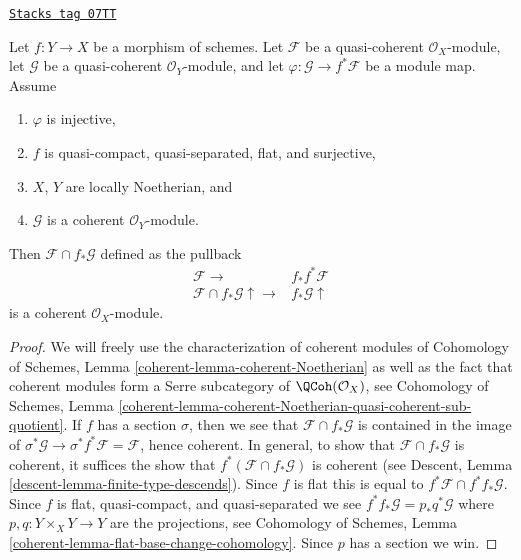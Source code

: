 \begin{lemma}
\label{groupoids-lemma-push-pull}
\href{https://stacks.math.columbia.edu/tag/07TT}{\texttt{Stacks tag 07TT}}

Let $f : Y \to X$ be a morphism of schemes. Let $\mathcal{F}$
be a quasi-coherent $\mathcal{O}_X$-module, let $\mathcal{G}$
be a quasi-coherent $\mathcal{O}_Y$-module, and let
$\varphi : \mathcal{G} \to f^*\mathcal{F}$ be a module map. Assume
\begin{enumerate}
\item $\varphi$ is injective,
\item $f$ is quasi-compact, quasi-separated, flat, and surjective,
\item $X$, $Y$ are locally Noetherian, and
\item $\mathcal{G}$ is a coherent $\mathcal{O}_Y$-module.
\end{enumerate}
Then $\mathcal{F} \cap f_*\mathcal{G}$ defined as the pullback
$$
\begin{array}{cc}\mathcal{F} \longrightarrow & f_*f^*\mathcal{F} \\ \mathcal{F} \cap f_*\mathcal{G} \uparrow\longrightarrow & f_*\mathcal{G} \uparrow\end{array}
$$
is a coherent $\mathcal{O}_X$-module.
\end{lemma}

\begin{proof}
We will freely use the characterization of coherent modules of
Cohomology of Schemes, Lemma \ref{coherent-lemma-coherent-Noetherian}
as well as the fact that coherent modules form a Serre subcategory
of $\QCoh(\mathcal{O}_X)$, see
Cohomology of Schemes,
Lemma \ref{coherent-lemma-coherent-Noetherian-quasi-coherent-sub-quotient}.
If $f$ has a section $\sigma$, then we see that
$\mathcal{F} \cap f_*\mathcal{G}$ is contained in the image of
$\sigma^*\mathcal{G} \to \sigma^*f^*\mathcal{F} = \mathcal{F}$,
hence coherent. In general, to show that $\mathcal{F} \cap f_*\mathcal{G}$
is coherent, it suffices the show that
$f^*(\mathcal{F} \cap f_*\mathcal{G})$ is coherent (see
Descent, Lemma \ref{descent-lemma-finite-type-descends}).
Since $f$ is flat this is equal to $f^*\mathcal{F} \cap f^*f_*\mathcal{G}$.
Since $f$ is flat, quasi-compact, and quasi-separated we see
$f^*f_*\mathcal{G} = p_*q^*\mathcal{G}$ where $p, q : Y \times_X Y \to Y$
are the projections, see
Cohomology of Schemes, Lemma \ref{coherent-lemma-flat-base-change-cohomology}.
Since $p$ has a section we win.
\end{proof}

